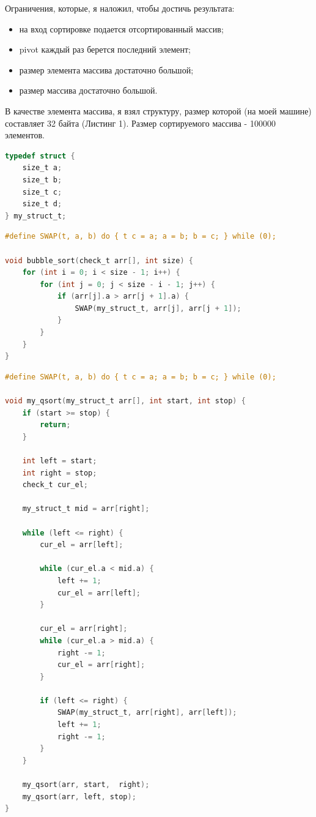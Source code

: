 \documentclass[12pt]{report}
\begin{document}
\thispagestyle{empty}

Ограничения, которые, я наложил, чтобы достичь результата:

\begin{itemize}
	\item на вход сортировке подается отсортированный массив;
	\item pivot каждый раз берется последний элемент;
	\item размер элемента массива достаточно большой;
	\item размер массива достаточно большой.
\end{itemize}

В качестве элемента массива, я взял структуру, размер которой (на моей машине) составляет 32 байта (Листинг 1). Размер сортируемого массива - 100000
элементов.

\begin{lstlisting}[label=some-code,caption=Элемент сортируемого массива, language=C]
typedef struct {
	size_t a;
	size_t b;
	size_t c;
	size_t d;
} my_struct_t;
\end{lstlisting}

\begin{lstlisting}[label=bsort,caption=Функция сортировки массива пузырьком, language=C]
#define SWAP(t, a, b) do { t c = a; a = b; b = c; } while (0);

void bubble_sort(check_t arr[], int size) {
	for (int i = 0; i < size - 1; i++) {
		for (int j = 0; j < size - i - 1; j++) {
			if (arr[j].a > arr[j + 1].a) {
				SWAP(my_struct_t, arr[j], arr[j + 1]);
			}
		}
	}
}
\end{lstlisting}

\begin{lstlisting}[label=qsort,caption=Функция быстрой сортировки, language=C]
#define SWAP(t, a, b) do { t c = a; a = b; b = c; } while (0);

void my_qsort(my_struct_t arr[], int start, int stop) {
	if (start >= stop) {
		return;
	}

	int left = start;
	int right = stop;
	check_t cur_el;

	my_struct_t mid = arr[right];

	while (left <= right) {
		cur_el = arr[left];

		while (cur_el.a < mid.a) {
			left += 1;
			cur_el = arr[left];
		}

		cur_el = arr[right];
		while (cur_el.a > mid.a) {
			right -= 1;
			cur_el = arr[right];
		}
		
		if (left <= right) {
			SWAP(my_struct_t, arr[right], arr[left]);
			left += 1;
			right -= 1;
		}
	}

	my_qsort(arr, start,  right);
	my_qsort(arr, left, stop);
}
\end{lstlisting}
\end{document}
